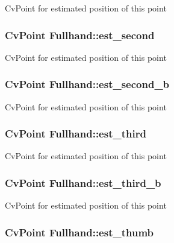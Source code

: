 \label{classFullhand_a86105eb44b5dbb35dee539a9d7b0739a}
CvPoint for estimated position of this point \hypertarget{classFullhand_a8c7e6d4c68fde49322b9f0b1b75e9875}{
\subsubsection[{est\_\-second}]{\setlength{\rightskip}{0pt plus 5cm}CvPoint {\bf Fullhand::est\_\-second}}}
\label{classFullhand_a8c7e6d4c68fde49322b9f0b1b75e9875}
CvPoint for estimated position of this point \hypertarget{classFullhand_a28eba027020a49d241fcd932560b8b70}{
\subsubsection[{est\_\-second\_\-b}]{\setlength{\rightskip}{0pt plus 5cm}CvPoint {\bf Fullhand::est\_\-second\_\-b}}}
\label{classFullhand_a28eba027020a49d241fcd932560b8b70}
CvPoint for estimated position of this point \hypertarget{classFullhand_ac2f0b8420e115e46150ce3e890994cf2}{
\subsubsection[{est\_\-third}]{\setlength{\rightskip}{0pt plus 5cm}CvPoint {\bf Fullhand::est\_\-third}}}
\label{classFullhand_ac2f0b8420e115e46150ce3e890994cf2}
CvPoint for estimated position of this point \hypertarget{classFullhand_a988a924b677a58065150a33d50fe0dff}{
\subsubsection[{est\_\-third\_\-b}]{\setlength{\rightskip}{0pt plus 5cm}CvPoint {\bf Fullhand::est\_\-third\_\-b}}}
\label{classFullhand_a988a924b677a58065150a33d50fe0dff}
CvPoint for estimated position of this point \hypertarget{classFullhand_a684a292b453f166c89d83bf44c5915bc}{
\subsubsection[{est\_\-thumb}]{\setlength{\rightskip}{0pt plus 5cm}CvPoint {\bf Fullhand::est\_\-thumb}}}
